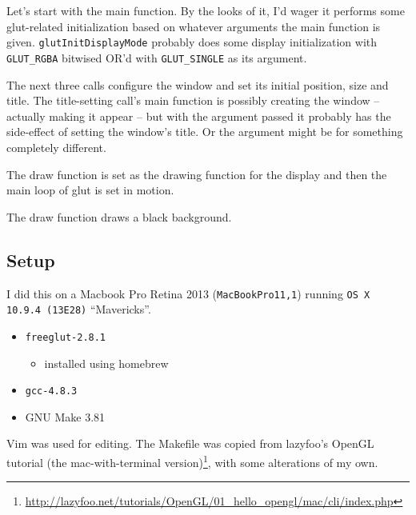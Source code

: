 \section{} %
Let's start with the main function.
By the looks of it, I'd wager it performs some glut-related initialization based on whatever arguments the main function is given.
\texttt{glutInitDisplayMode} probably does some display initialization with \texttt{GLUT\_RGBA} bitwised OR'd with \texttt{GLUT\_SINGLE} as its argument.

The next three calls configure the window and set its initial position, size and title.
The title-setting call's main function is possibly creating the window -- actually making it appear -- but with the argument passed it probably has the side-effect of setting the window's title.
Or the argument might be for something completely different.

The draw function is set as the drawing function for the display and then the main loop of glut is set in motion.

The draw function draws a black background.

\subsection{Setup}
I did this on a Macbook Pro Retina 2013 (\texttt{MacBookPro11,1}) running \texttt{OS X 10.9.4 (13E28)} ``Mavericks''.
\begin{itemize}
    \item \texttt{freeglut-2.8.1}
        \begin{itemize}
            \item installed using homebrew
        \end{itemize}
    \item \texttt{gcc-4.8.3}
    \item GNU Make 3.81
\end{itemize}

Vim was used for editing.
The Makefile was copied from lazyfoo's OpenGL tutorial (the mac-with-terminal version)\footnote{\url{http://lazyfoo.net/tutorials/OpenGL/01_hello_opengl/mac/cli/index.php}}, with some alterations of my own.
